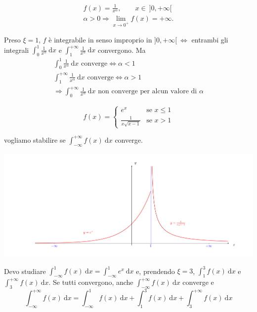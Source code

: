 \begin{exbar}
\begin{example}
	\begin{gather*}
		f(x)=\frac{1}{x^\alpha}, \qquad x \in \ ]0,+\infty[
		\\
		\alpha > 0 \Rightarrow \lim_{x \rightarrow 0^+} f(x)=+\infty.
	\end{gather*}
	
	Preso $\xi=1$, $f$ è integrabile in senso improprio in $]0,+\infty[ \ \iff$ entrambi gli integrali $\int_{0}^{1} \frac{1}{x^\alpha} \ \mathrm{d}x$ e $\int_{1}^{+\infty} \frac{1}{x^\alpha} \ \mathrm{d}x$ convergono. Ma
	\begin{gather*}
		\int_{0}^{1} \frac{1}{x^\alpha} \ \mathrm{d}x \text{ converge} \iff \alpha < 1 
		\\
		\int_{1}^{+\infty} \frac{1}{x^\alpha} \ \mathrm{d}x \text{ converge} \iff \alpha > 1
		\\
		\Rightarrow \int_{0}^{+\infty} \frac{1}{x^\alpha} \ \mathrm{d}x \text{ non converge per alcun valore di } \alpha
	\end{gather*}
\end{example}
\end{exbar}


\begin{exbar}
\begin{example}
	\begin{equation*}
		f(x)= 
		\begin{cases}
			e^x & \text{se } x \leq 1 
			\\
			\frac{1}{x \sqrt{x-1}} & \text{se } x>1
		\end{cases}
	\end{equation*}
	
	vogliamo stabilire se $\int_{-\infty}^{+\infty} f(x) \ \mathrm{d}x$ converge.
	\begin{center}
		\includegraphics[width=0.75\linewidth]{integrali_impropri/pag89}
		\label{fig:pag89}
	\end{center}
	
	Devo studiare $\int_{-\infty}^{1} f(x) \ \mathrm{d}x = \int_{-\infty}^{1} e^x \ \mathrm{d}x$ e, prendendo $\xi=3$,  $\int_{1}^{3} f(x) \ \mathrm{d}x$ e $\int_{3}^{+\infty} f(x) \ \mathrm{d}x$. Se tutti convergono, anche $\int_{-\infty}^{+\infty} f(x) \ \mathrm{d}x$ converge e 
	\begin{equation*}
		\int_{-\infty}^{+\infty} f(x) \ \mathrm{d}x = \int_{-\infty}^{1} f(x) \ \mathrm{d}x + \int_{1}^{3} f(x) \ \mathrm{d}x + \int_{3}^{+\infty} f(x) \ \mathrm{d}x
	\end{equation*}
\end{example}
\end{exbar}

